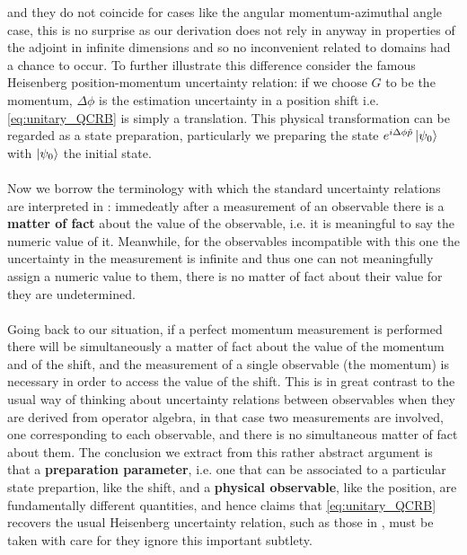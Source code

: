 and they do not coincide for cases like the angular momentum-azimuthal angle case, this is no surprise as our derivation does not rely in
anyway in properties of the adjoint in infinite dimensions and so no inconvenient related to domains had a chance to occur. To further illustrate this
difference consider the famous Heisenberg position-momentum uncertainty relation: if we choose $G$ to be the momentum, $\Delta \phi$ is
the estimation uncertainty in a position shift i.e. \eqref{eq:unitary_QCRB} is simply a translation. This physical transformation can be
regarded as a state preparation, particularly we preparing the state $e^{i\Delta \phi \hat{p}}\ket{\psi_{0}}$ with $\ket{\psi_{0}}$ the
initial state.
\\\\
Now we borrow the terminology with which the standard uncertainty relations are interpreted in \cite{albert1994quantum}: immedeatly after a
measurement of an observable there is a \textbf{matter of fact} about the value of the observable, i.e. it is meaningful to say the numeric
value of it. Meanwhile, for the observables incompatible with this one the uncertainty in the measurement is infinite and thus one can not
meaningfully assign a numeric value to them, there is no matter of fact about their value for they are undetermined.
\\\\
Going back to our situation, if a perfect momentum measurement is performed there will be simultaneously a matter of fact about the
value of the momentum and of the shift, and the measurement of a single observable (the momentum) is necessary in order to access the value of
the shift. This is in great contrast to the usual way of thinking about uncertainty relations between observables when they are derived from
operator algebra, in that case two measurements are involved, one corresponding to each observable, and there is no simultaneous matter of fact
about them. The conclusion we extract from this rather abstract argument is that a \textbf{preparation
  parameter}, i.e. one that can be associated to a particular state prepartion, like the shift, and a \textbf{physical observable}, like the position, are fundamentally different quantities, and hence claims that \eqref{eq:unitary_QCRB} recovers the usual Heisenberg uncertainty relation, such as those in \cite{wiseman_quantum_2010}, must be taken with care for they ignore this important subtlety.

